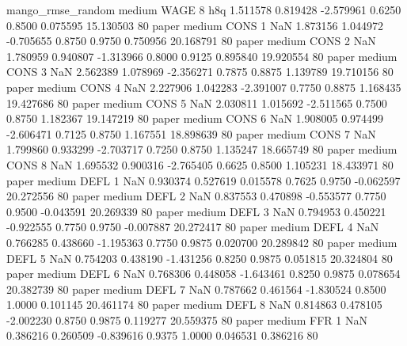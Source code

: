 mango_rmse_random     medium     WAGE                 8                  h8q  1.511578 0.819428 -2.579961 0.6250 0.8500  0.075595   15.130503 80
            paper     medium     CONS                 1                  NaN  1.873156 1.044972 -0.705655 0.8750 0.9750  0.750956   20.168791 80
            paper     medium     CONS                 2                  NaN  1.780959 0.940807 -1.313966 0.8000 0.9125  0.895840   19.920554 80
            paper     medium     CONS                 3                  NaN  2.562389 1.078969 -2.356271 0.7875 0.8875  1.139789   19.710156 80
            paper     medium     CONS                 4                  NaN  2.227906 1.042283 -2.391007 0.7750 0.8875  1.168435   19.427686 80
            paper     medium     CONS                 5                  NaN  2.030811 1.015692 -2.511565 0.7500 0.8750  1.182367   19.147219 80
            paper     medium     CONS                 6                  NaN  1.908005 0.974499 -2.606471 0.7125 0.8750  1.167551   18.898639 80
            paper     medium     CONS                 7                  NaN  1.799860 0.933299 -2.703717 0.7250 0.8750  1.135247   18.665749 80
            paper     medium     CONS                 8                  NaN  1.695532 0.900316 -2.765405 0.6625 0.8500  1.105231   18.433971 80
            paper     medium     DEFL                 1                  NaN  0.930374 0.527619  0.015578 0.7625 0.9750 -0.062597   20.272556 80
            paper     medium     DEFL                 2                  NaN  0.837553 0.470898 -0.553577 0.7750 0.9500 -0.043591   20.269339 80
            paper     medium     DEFL                 3                  NaN  0.794953 0.450221 -0.922555 0.7750 0.9750 -0.007887   20.272417 80
            paper     medium     DEFL                 4                  NaN  0.766285 0.438660 -1.195363 0.7750 0.9875  0.020700   20.289842 80
            paper     medium     DEFL                 5                  NaN  0.754203 0.438190 -1.431256 0.8250 0.9875  0.051815   20.324804 80
            paper     medium     DEFL                 6                  NaN  0.768306 0.448058 -1.643461 0.8250 0.9875  0.078654   20.382739 80
            paper     medium     DEFL                 7                  NaN  0.787662 0.461564 -1.830524 0.8500 1.0000  0.101145   20.461174 80
            paper     medium     DEFL                 8                  NaN  0.814863 0.478105 -2.002230 0.8750 0.9875  0.119277   20.559375 80
            paper     medium      FFR                 1                  NaN  0.386216 0.260509 -0.839616 0.9375 1.0000  0.046531    0.386216 80
